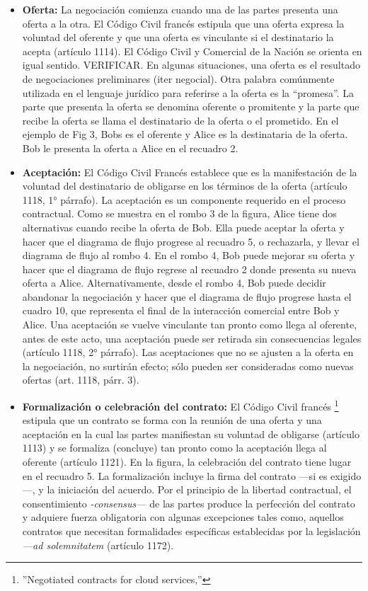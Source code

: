 \documentclass[12pt]{report} %
\begin{document}
\begin{itemize}
    \item \textbf{ Oferta:} La negociación comienza cuando una de las partes presenta una oferta a la otra. El Código Civil francés  estipula que una oferta expresa la voluntad del oferente y que una oferta es vinculante si el destinatario la acepta (artículo 1114). El Código Civil y Comercial de la Nación se orienta en igual sentido. VERIFICAR. En algunas situaciones, una oferta es el resultado de negociaciones preliminares (iter negocial). Otra palabra comúnmente utilizada en el lenguaje jurídico para referirse a la oferta es la “promesa”. La parte que presenta la oferta se denomina oferente o promitente y la parte que recibe la oferta se llama el destinatario de la oferta o el prometido. En el ejemplo de Fig 3, Bobs es el oferente y Alice es la destinataria de la oferta. Bob le presenta la oferta a Alice en el recuadro 2.
    \item \textbf{Aceptación:} El Código Civil Francés establece que es la manifestación de la voluntad del destinatario de obligarse en los términos de la oferta (artículo 1118, 1° párrafo). La aceptación es un componente requerido en el proceso contractual. Como se muestra en el rombo 3 de la figura, Alice tiene dos alternativas cuando recibe la oferta de Bob. Ella puede aceptar la oferta y hacer que el diagrama de flujo progrese al recuadro 5, o rechazarla, y llevar el diagrama de flujo al rombo 4. En el rombo 4, Bob puede mejorar su oferta y hacer que el diagrama de flujo regrese al recuadro 2 donde presenta su nueva oferta a Alice. Alternativamente, desde el rombo 4, Bob puede decidir abandonar la negociación y hacer que el diagrama de flujo progrese hasta el cuadro 10, que representa el final de la interacción comercial entre Bob y Alice. Una aceptación se vuelve vinculante tan pronto como llega al oferente, antes de este acto, una aceptación puede ser retirada sin consecuencias legales (artículo 1118, 2° párrafo). Las aceptaciones que no se ajusten a la oferta en la negociación, no surtirán efecto; sólo pueden ser consideradas como nuevas ofertas (art. 1118, párr. 3).

    \item \textbf{Formalización o celebración del contrato: } El Código Civil francés \footnote{\cite{Millard2013}''Negotiated contracts for cloud services,'' } estipula que un contrato se forma con la reunión de una oferta y una aceptación en la cual las partes manifiestan su voluntad de obligarse (artículo 1113) y se formaliza (concluye) tan pronto como la aceptación llega al oferente (artículo 1121). En la figura, la celebración del contrato tiene lugar en el recuadro 5. La formalización incluye la firma del contrato —si es exigido—, y la iniciación del acuerdo. Por el principio de la libertad contractual, el consentimiento \textit{-consensus— }de las partes produce la perfección del contrato y adquiere fuerza obligatoria con algunas excepciones tales como, aquellos contratos que necesitan formalidades específicas establecidas por la legislación \textit{—ad solemnitatem} (artículo 1172).
\end{itemize}
\end{document}
